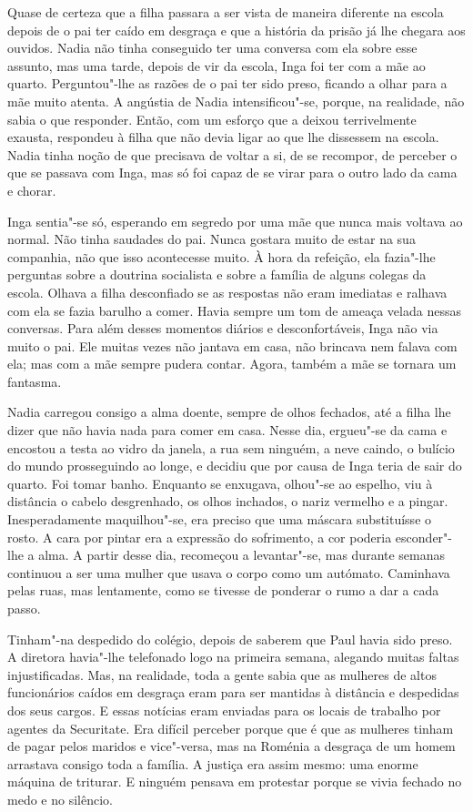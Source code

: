 Quase de certeza que a filha passara a ser vista de maneira diferente na
escola depois de o pai ter caído em desgraça e que a história da prisão
já lhe chegara aos ouvidos. Nadia não tinha conseguido ter uma conversa
com ela sobre esse assunto, mas uma tarde, depois de vir da escola, Inga
foi ter com a mãe ao quarto. Perguntou"-lhe as razões de o pai ter sido
preso, ficando a olhar para a mãe muito atenta. A angústia de Nadia
intensificou"-se, porque, na realidade, não sabia o que responder. Então,
com um esforço que a deixou terrivelmente exausta, respondeu à filha
que não devia ligar ao que lhe dissessem na escola. Nadia tinha noção de
que precisava de voltar a si, de se recompor, de perceber o que se
passava com Inga, mas só foi capaz de se virar para o outro lado da cama
e chorar.

Inga sentia"-se só, esperando em segredo por uma mãe
que nunca mais voltava ao normal. Não tinha saudades do pai. Nunca
gostara muito de estar na sua companhia, não que isso acontecesse muito.
À hora da refeição, ela fazia"-lhe perguntas sobre a doutrina socialista e sobre a família de alguns
colegas da escola. Olhava a filha desconfiado se as respostas não eram
imediatas e ralhava com ela se fazia barulho a comer. Havia sempre um
tom de ameaça velada nessas conversas. Para além desses momentos diários
e desconfortáveis, Inga não via muito o pai. Ele muitas vezes não
jantava em casa, não brincava nem falava com ela; mas com a mãe sempre
pudera contar. Agora, também a mãe se tornara um fantasma.

\bigskip

Nadia carregou consigo a alma doente, sempre de olhos fechados, até a
filha lhe dizer que não havia nada para comer em casa. Nesse dia,
ergueu"-se da cama e encostou a testa ao vidro da janela, a rua sem
ninguém, a neve caindo, o bulício do mundo prosseguindo ao longe, e
decidiu que por causa de Inga teria de sair do quarto. Foi tomar banho.
Enquanto se enxugava, olhou"-se ao espelho, viu à distância o cabelo
desgrenhado, os olhos inchados, o nariz vermelho e a pingar.
Inesperadamente maquilhou"-se, era preciso que uma máscara substituísse o rosto. A cara por pintar
era a expressão do sofrimento, a cor poderia esconder"-lhe a alma. A
partir desse dia, recomeçou a levantar"-se, mas durante semanas continuou
a ser uma mulher que usava o corpo como um autómato. Caminhava pelas
ruas, mas lentamente, como se tivesse de ponderar o rumo a dar a cada
passo.

Tinham"-na despedido do colégio, depois de saberem que Paul havia sido
preso. A diretora havia"-lhe telefonado logo na primeira semana,
alegando muitas faltas injustificadas. Mas, na realidade, toda a gente
sabia que as mulheres de altos funcionários caídos em desgraça eram para ser mantidas à
distância e despedidas dos seus cargos. E essas notícias eram enviadas
para os locais de trabalho por agentes da Securitate. Era difícil
perceber porque que é que as mulheres tinham de pagar pelos maridos e
vice"-versa, mas na Roménia a desgraça de um homem arrastava consigo
toda a família. A justiça era assim mesmo: uma enorme máquina de
triturar. E ninguém pensava em protestar porque se vivia fechado no
medo e no silêncio.

